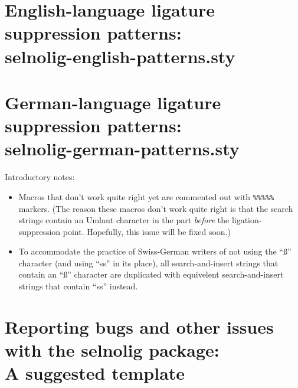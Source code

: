 \documentclass[12pt]{article}
\newcommand{\pkg}[1]{\textsf{#1}}
\begin{document}

\clearpage
{}

\section[English-language ligature suppression patterns: selnolig-english-patterns.sty]{English-language ligature suppression patterns: \\ 
\pkg{selnolig-english-patterns.sty}}
\label{sec:eng-listing}

\begin{multicols}{2}
\end{multicols}

\clearpage
\section[German-language ligature suppression patterns:
selnolig-german-patterns.sty]{German-language ligature suppression patterns: \\ 
\pkg{selnolig-german-patterns.sty}}
\label{sec:germ-listing}

\begin{multicols}{2}

Introductory notes: 
\begin{itemize}
\item Macros that don't work quite right yet are commented out with \Verb/%
(The reason these macros don't work quite right is that the search strings contain an Umlaut character in the part \emph{before} the ligation-suppression point. Hopefully, this issue will be fixed soon.)

\item To accommodate the practice of Swiss-German writers of not using the \enquote{ß} character (and using \enquote{ss} in its place), all search-and-insert strings that contain an \enquote{ß} character are duplicated with equivelent search-and-insert strings that contain \enquote{ss} instead.

\end{itemize}


\end{multicols}

\clearpage
\section[Reporting bugs and other issues with the selnolig package: A suggested template]{Reporting bugs and other issues with the \pkg{selnolig} package:\\A suggested template} \label{sec:template}

\end{document}
